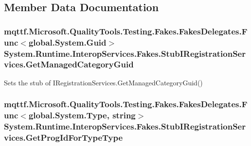 \subsection{Member Data Documentation}
\hypertarget{class_system_1_1_runtime_1_1_interop_services_1_1_fakes_1_1_stub_i_registration_services_afb8e9e49cf89885d4ab77f1956e79820}{
\subsubsection[{Get\-Managed\-Category\-Guid}]{\setlength{\rightskip}{0pt plus 5cm}mqttf.\-Microsoft.\-Quality\-Tools.\-Testing.\-Fakes.\-Fakes\-Delegates.\-Func$<$global.\-System.\-Guid$>$ System.\-Runtime.\-Interop\-Services.\-Fakes.\-Stub\-I\-Registration\-Services.\-Get\-Managed\-Category\-Guid}}\label{class_system_1_1_runtime_1_1_interop_services_1_1_fakes_1_1_stub_i_registration_services_afb8e9e49cf89885d4ab77f1956e79820}


Sets the stub of I\-Registration\-Services.\-Get\-Managed\-Category\-Guid()

\hypertarget{class_system_1_1_runtime_1_1_interop_services_1_1_fakes_1_1_stub_i_registration_services_a2b868a1452cb71b2a1ef70b1fc0e3e22}{
\subsubsection[{Get\-Prog\-Id\-For\-Type\-Type}]{\setlength{\rightskip}{0pt plus 5cm}mqttf.\-Microsoft.\-Quality\-Tools.\-Testing.\-Fakes.\-Fakes\-Delegates.\-Func$<$global.\-System.\-Type, string$>$ System.\-Runtime.\-Interop\-Services.\-Fakes.\-Stub\-I\-Registration\-Services.\-Get\-Prog\-Id\-For\-Type\-Type}}\label{class_system_1_1_runtime_1_1_interop_services_1_1_fakes_1_1_stub_i_registration_services_a2b868a1452cb71b2a1ef70b1fc0e3e22}


